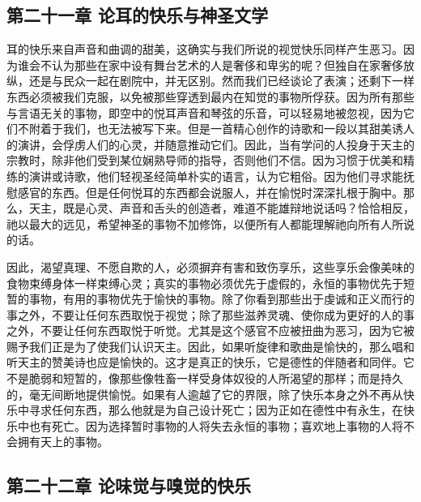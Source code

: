 
\subsection{第二十一章 论耳的快乐与神圣文学}

耳的快乐来自声音和曲调的甜美，这确实与我们所说的视觉快乐同样产生恶习。因为谁会不认为那些在家中设有舞台艺术的人是奢侈和卑劣的呢？但独自在家奢侈放纵，还是与民众一起在剧院中，并无区别。然而我们已经谈论了表演；还剩下一样东西必须被我们克服，以免被那些穿透到最内在知觉的事物所俘获。因为所有那些与言语无关的事物，即空中的悦耳声音和琴弦的乐音，可以轻易地被忽视，因为它们不附着于我们，也无法被写下来。但是一首精心创作的诗歌和一段以其甜美诱人的演讲，会俘虏人们的心灵，并随意推动它们。因此，当有学问的人投身于天主的宗教时，除非他们受到某位娴熟导师的指导，否则他们不信。因为习惯于优美和精练的演讲或诗歌，他们轻视圣经简单朴实的语言，认为它粗俗。因为他们寻求能抚慰感官的东西。但是任何悦耳的东西都会说服人，并在愉悦时深深扎根于胸中。那么，天主，既是心灵、声音和舌头的创造者，难道不能雄辩地说话吗？恰恰相反，祂以最大的远见，希望神圣的事物不加修饰，以便所有人都能理解祂向所有人所说的话。\par

因此，渴望真理、不愿自欺的人，必须摒弃有害和致伤享乐，这些享乐会像美味的食物束缚身体一样束缚心灵；真实的事物必须优先于虚假的，永恒的事物优先于短暂的事物，有用的事物优先于愉快的事物。除了你看到那些出于虔诚和正义而行的事之外，不要让任何东西取悦于视觉；除了那些滋养灵魂、使你成为更好的人的事之外，不要让任何东西取悦于听觉。尤其是这个感官不应被扭曲为恶习，因为它被赐予我们正是为了使我们认识天主。因此，如果听旋律和歌曲是愉快的，那么唱和听天主的赞美诗也应是愉快的。这才是真正的快乐，它是德性的伴随者和同伴。它不是脆弱和短暂的，像那些像牲畜一样受身体奴役的人所渴望的那样；而是持久的，毫无间断地提供愉悦。如果有人逾越了它的界限，除了快乐本身之外不再从快乐中寻求任何东西，那么他就是为自己设计死亡；因为正如在德性中有永生，在快乐中也有死亡。因为选择暂时事物的人将失去永恒的事物；喜欢地上事物的人将不会拥有天上的事物。\par


\subsection{第二十二章 论味觉与嗅觉的快乐}

